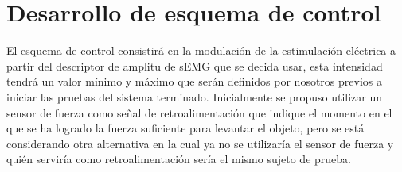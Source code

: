 \section{Desarrollo de esquema de control}
El esquema de control consistirá en la modulación de la estimulación eléctrica a partir del descriptor de amplitu de sEMG que se decida usar, esta intensidad tendrá un valor mínimo y máximo que serán definidos por nosotros previos a iniciar las pruebas del sistema terminado. Inicialmente se propuso utilizar un sensor de fuerza como señal de retroalimentación que indique el momento en el que se ha logrado la fuerza suficiente para levantar el objeto, pero se está considerando otra alternativa en la cual ya no se utilizaría el sensor de fuerza y quién serviría como retroalimentación sería el mismo sujeto de prueba.